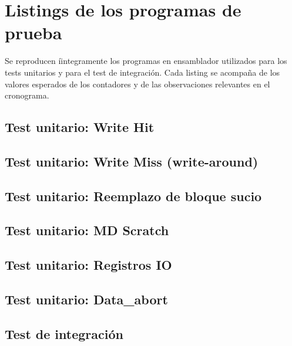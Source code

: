 \section{Listings de los programas de prueba}
\label{ap:asm}

Se reproducen \'iintegramente los programas en ensamblador utilizados para los
tests unitarios y para el test de integraci\'on. Cada listing se acompa\~na de
los valores esperados de los contadores y de las observaciones relevantes en el
cronograma.

\subsection{Test unitario: Write Hit}


\subsection{Test unitario: Write Miss (write-around)}


\subsection{Test unitario: Reemplazo de bloque sucio}


\subsection{Test unitario: MD Scratch}


\subsection{Test unitario: Registros IO}


\subsection{Test unitario: Data\_abort}


\subsection{Test de integraci\'on}
\label{ap:integracion}

